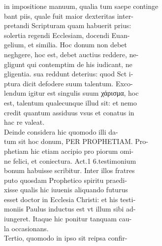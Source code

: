 \documentclass{article}
\begin{document}
\begin{pages}
                in impositione manuum, qualia tum saepe continge \\
                bant piis, quale fuit maior dexteritas inter- \\
                pretandi Scripturam quam habuerit prius: \\
                solertia regendi Ecclesiam, docendi Euan- \\
                gelium, et similia. Hoc donum non debet \\
                neghgere, hoc est, debet auctius reddere, ne- \\
                gligunt qui contemptim de his iudicant, ne \\
                gligentia. sua reddunt deterius: quod Sct i- \\
                ptura dicit defodere suum talentum. Exco- \\
                lendum igitur est singulis suum χάρισμα, hoc \\
                est, talentum qualecunque illud sit: et nemo \\
                credit quantum assiduus vsus et conatus in \\
                hac re valeat. \\
                Deinde considera hic quomodo illi da- \\
                tum sit hoc donum, PER PROPHETIAM. Pro- \\
                phetiam hic etiam accipio pro piorum omi- \\
                ne felici, et coniectura. Act.1 6.testimonium \\
                bonum habuisse scribitur. Inter illos fratres \\
                puto quosdam Prophetico spiritu praedi- \\
                xisse qualis hic iuuenis aliquando futurus \\
                esset doctor in Ecclesia Christi: et his testi- \\
                moniis Paulus inductus est vt illum sibi ad- \\
                iungeret. Itaque hic ponitur tanquam cau- \\
                la occasionans. \\
                Tertio, quomodo in ipso sit reipsa confir- \\

\end{pages}
\end{document}
